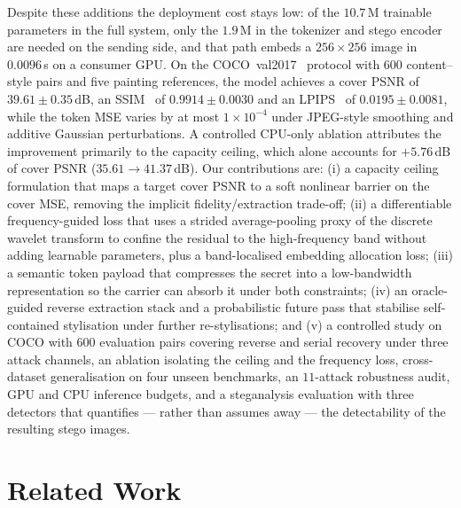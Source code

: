 \documentclass[conference]{IEEEtran}
\begin{document}
Despite these additions the deployment cost stays low: of the $10.7$\,M trainable parameters in the full system, only the $1.9$\,M in the tokenizer and stego encoder are needed on the sending side, and that path embeds a $256\!\times\!256$ image in $0.0096$\,s on a consumer GPU. On the COCO~val2017~\cite{coco} protocol with $600$ content--style pairs and five painting references, the model achieves a cover PSNR of $39.61\pm0.35$\,dB, an SSIM~\cite{ssim} of $0.9914\pm0.0030$ and an LPIPS~\cite{lpips} of $0.0195\pm0.0081$, while the token MSE varies by at most $1\times10^{-4}$ under JPEG-style smoothing and additive Gaussian perturbations. A controlled CPU-only ablation attributes the improvement primarily to the capacity ceiling, which alone accounts for $+5.76$\,dB of cover PSNR ($35.61\to41.37$\,dB). Our contributions are: (i) a capacity ceiling formulation that maps a target cover PSNR to a soft nonlinear barrier on the cover MSE, removing the implicit fidelity/extraction trade-off; (ii) a differentiable frequency-guided loss that uses a strided average-pooling proxy of the discrete wavelet transform to confine the residual to the high-frequency band without adding learnable parameters, plus a band-localised embedding allocation loss; (iii) a semantic token payload that compresses the secret into a low-bandwidth representation so the carrier can absorb it under both constraints; (iv) an oracle-guided reverse extraction stack and a probabilistic future pass that stabilise self-contained stylisation under further re-stylisations; and (v) a controlled study on COCO with $600$ evaluation pairs covering reverse and serial recovery under three attack channels, an ablation isolating the ceiling and the frequency loss, cross-dataset generalisation on four unseen benchmarks, an $11$-attack robustness audit, GPU and CPU inference budgets, and a steganalysis evaluation with three detectors that quantifies --- rather than assumes away --- the detectability of the resulting stego images.

\section{Related Work}
\label{sec:relwork}
\end{document}
